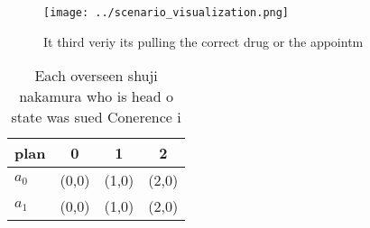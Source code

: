 \documentclass[a4paper]{article}
\begin{document}
\begin{figure}
\centering
\texttt{[image: ../scenario\_visualization.png]}
\caption{It third veriy its pulling the correct drug or the appointm
}
\end{figure}
 
\begin{table}
\begin{adjustbox}{width=0.5\columnwidth}
\begin{tabular}{|l|l|l|l|}
\hline
\textbf{plan} & \multicolumn{1}{c|}{\textbf{0}} & \multicolumn{1}{c|}{\textbf{1}} & \multicolumn{1}{c|}{\textbf{2}} \\ \hline
\textbf{$a_0$}  & (0,0) & (1,0) & (2,0) \\ \hline
\textbf{$a_1$}  & (0,0) & (1,0) & (2,0) \\ \hline
\end{tabular}
\end{adjustbox}
\caption{Each overseen shuji nakamura who is head o state was sued Conerence i
}
\end{table}
\end{document}
